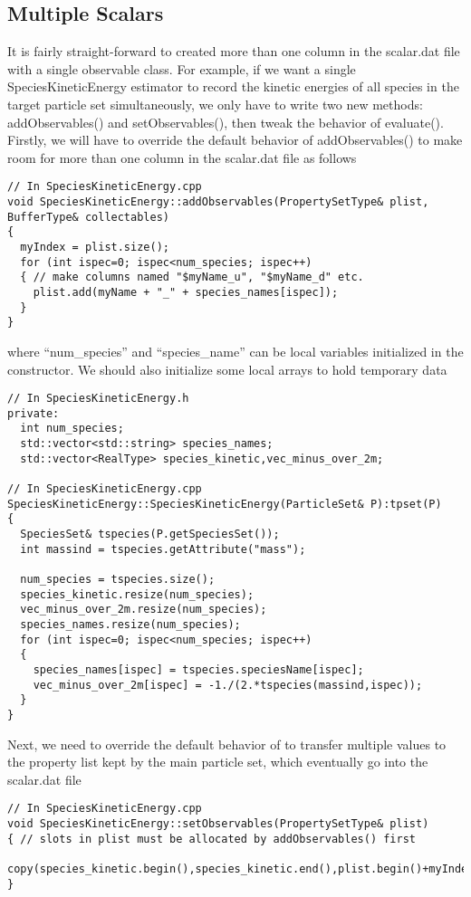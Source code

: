 \subsection{Multiple Scalars}
It is fairly straight-forward to created more than one column in the scalar.dat file with a single observable class. For example, if we want a single SpeciesKineticEnergy estimator to record the kinetic energies of all species in the target particle set simultaneously, we only have to write two new methods: addObservables() and setObservables(), then tweak the behavior of evaluate(). Firstly, we will have to override the default behavior of addObservables() to make room for more than one column in the scalar.dat file as follows
\begin{lstlisting}[style=C++]
// In SpeciesKineticEnergy.cpp
void SpeciesKineticEnergy::addObservables(PropertySetType& plist, BufferType& collectables)
{
  myIndex = plist.size();
  for (int ispec=0; ispec<num_species; ispec++)
  { // make columns named "$myName_u", "$myName_d" etc.
    plist.add(myName + "_" + species_names[ispec]);
  }
}
\end{lstlisting}
where ``num\_species'' and ``species\_name'' can be local variables initialized in the constructor. We should also initialize some local arrays to hold temporary data
\begin{lstlisting}[style=C++]
// In SpeciesKineticEnergy.h
private:
  int num_species;
  std::vector<std::string> species_names;
  std::vector<RealType> species_kinetic,vec_minus_over_2m;
  
// In SpeciesKineticEnergy.cpp
SpeciesKineticEnergy::SpeciesKineticEnergy(ParticleSet& P):tpset(P)
{
  SpeciesSet& tspecies(P.getSpeciesSet());
  int massind = tspecies.getAttribute("mass");

  num_species = tspecies.size();
  species_kinetic.resize(num_species);
  vec_minus_over_2m.resize(num_species);
  species_names.resize(num_species);
  for (int ispec=0; ispec<num_species; ispec++)
  {
    species_names[ispec] = tspecies.speciesName[ispec];
    vec_minus_over_2m[ispec] = -1./(2.*tspecies(massind,ispec));   
  }
}
\end{lstlisting}
Next, we need to override the default behavior of  to transfer multiple values to the property list kept by the main particle set, which eventually go into the scalar.dat file
\begin{lstlisting}[style=C++]
// In SpeciesKineticEnergy.cpp
void SpeciesKineticEnergy::setObservables(PropertySetType& plist)
{ // slots in plist must be allocated by addObservables() first
  copy(species_kinetic.begin(),species_kinetic.end(),plist.begin()+myIndex);
}
\end{lstlisting}
